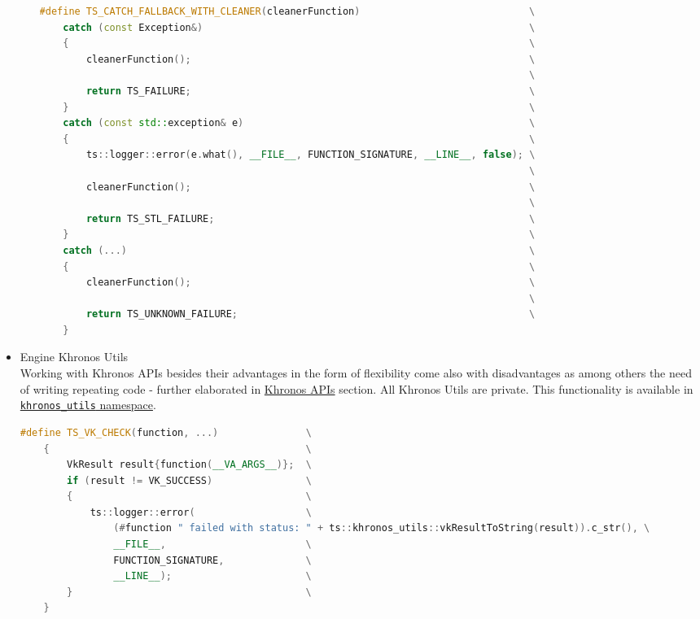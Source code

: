 \begin{itemize}
\begin{itemize}
\begin{lstlisting}[language=c++, caption=Private Engine Utils (./engine/src/internal\_utils.h)]
#define TS_CATCH_FALLBACK_WITH_CLEANER(cleanerFunction)                             \
    catch (const Exception&)                                                        \
    {                                                                               \
        cleanerFunction();                                                          \
                                                                                    \
        return TS_FAILURE;                                                          \
    }                                                                               \
    catch (const std::exception& e)                                                 \
    {                                                                               \
        ts::logger::error(e.what(), __FILE__, FUNCTION_SIGNATURE, __LINE__, false); \
                                                                                    \
        cleanerFunction();                                                          \
                                                                                    \
        return TS_STL_FAILURE;                                                      \
    }                                                                               \
    catch (...)                                                                     \
    {                                                                               \
        cleanerFunction();                                                          \
                                                                                    \
        return TS_UNKNOWN_FAILURE;                                                  \
    }
\end{lstlisting}
    \end{itemize}
    \item Engine Khronos Utils\\
    \label{sec:khronos_utils}
    Working with Khronos APIs besides their advantages in the form of flexibility come also with disadvantages as among others the need of writing repeating code - further elaborated in \hyperref[sec:registry]{Khronos APIs} section. All Khronos Utils are private.
    This functionality is available in \hyperref[sec:namespaces]{\texttt{khronos\_utils} namespace}.
\begin{lstlisting}[language=c++, caption=Khronos Utils (./engine/src/khronos\_utils.h)]
#define TS_VK_CHECK(function, ...)               \
    {                                            \
        VkResult result{function(__VA_ARGS__)};  \
        if (result != VK_SUCCESS)                \
        {                                        \
            ts::logger::error(                   \
                (#function " failed with status: " + ts::khronos_utils::vkResultToString(result)).c_str(), \
                __FILE__,                        \
                FUNCTION_SIGNATURE,              \
                __LINE__);                       \
        }                                        \
    }


\end{lstlisting}
\end{itemize}
